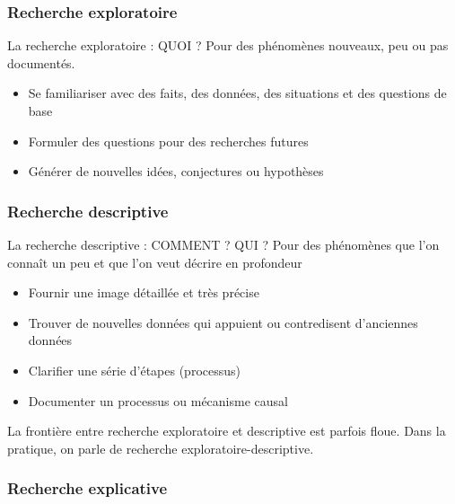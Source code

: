 \documentclass[french]{beamer}
\begin{document}
\subsubsection{Recherche exploratoire}

\begin{frame}{La recherche exploratoire : QUOI ?}
Pour des phénomènes nouveaux, peu ou pas documentés.
\begin{itemize}
	\item Se familiariser avec des faits, des données, des situations et des questions de base
	\item Formuler des questions pour des recherches futures
	\item Générer de nouvelles idées, conjectures ou hypothèses
\end{itemize}
\end{frame}


\subsubsection{Recherche descriptive}

\begin{frame}{La recherche descriptive : COMMENT ? QUI ?}
Pour des phénomènes que l'on connaît un peu et que l'on veut décrire en profondeur
\begin{itemize}
	\item Fournir une image détaillée et très précise
	\item Trouver de nouvelles données qui appuient ou contredisent d'anciennes données
	\item Clarifier une série d'étapes (processus)
	\item Documenter un processus ou mécanisme causal
\end{itemize}
La frontière entre recherche exploratoire et descriptive est parfois floue. Dans la pratique, on parle de recherche exploratoire-descriptive.
\end{frame}

\subsubsection{Recherche explicative}
\end{document}
